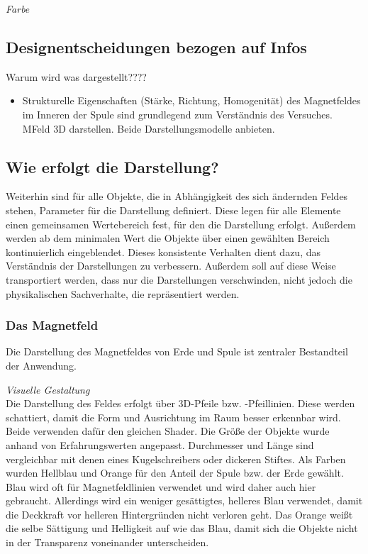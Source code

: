 \textit{Farbe}

\subsection{Designentscheidungen bezogen auf Infos}
Warum wird was dargestellt????
\begin{itemize}
	\item Strukturelle Eigenschaften (Stärke, Richtung, Homogenität) des Magnetfeldes im Inneren der Spule sind grundlegend zum Verständnis des Versuches. MFeld 3D darstellen. Beide Darstellungsmodelle anbieten. 
\end{itemize}
\subsection{Wie erfolgt die Darstellung?}
Weiterhin sind für alle Objekte, die in Abhängigkeit des sich ändernden Feldes stehen, Parameter für die Darstellung definiert. Diese legen für alle Elemente einen gemeinsamen Wertebereich fest, für den die Darstellung erfolgt. Außerdem werden ab dem minimalen Wert die Objekte über einen gewählten Bereich kontinuierlich eingeblendet. Dieses konsistente Verhalten dient dazu, das Verständnis der Darstellungen zu verbessern. Außerdem soll auf diese Weise transportiert werden, dass nur die Darstellungen verschwinden, nicht jedoch die physikalischen Sachverhalte, die repräsentiert werden.\\
\subsubsection{Das Magnetfeld}
\label{sec-4-2-2}
Die Darstellung des Magnetfeldes von Erde und Spule ist zentraler Bestandteil der Anwendung.

\textit{Visuelle Gestaltung}\\
Die Darstellung des Feldes erfolgt über 3D-Pfeile bzw. -Pfeillinien. Diese werden schattiert, damit die Form und Ausrichtung im Raum besser erkennbar wird. Beide verwenden dafür den gleichen Shader. Die Größe der Objekte wurde anhand von Erfahrungswerten angepasst. Durchmesser und Länge sind vergleichbar mit denen eines Kugelschreibers oder dickeren Stiftes. Als Farben wurden Hellblau und Orange für den Anteil der Spule bzw. der Erde gewählt. Blau wird oft für Magnetfeldlinien verwendet und wird daher auch hier gebraucht. Allerdings wird ein weniger gesättigtes, helleres Blau verwendet, damit die Deckkraft vor helleren Hintergründen nicht verloren geht. Das Orange weißt die selbe Sättigung und Helligkeit auf wie das Blau, damit sich die Objekte nicht in der Transparenz voneinander unterscheiden.\\

